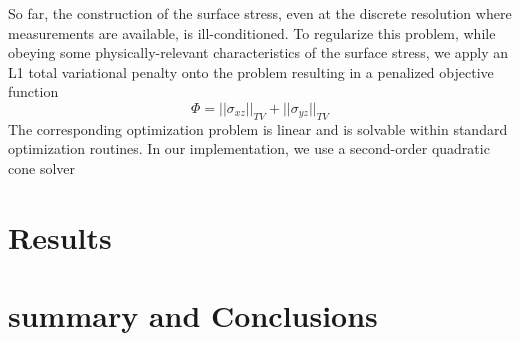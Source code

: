 \documentclass[aps,prl,reprint,twocolumn,groupedaddress,showpacs]{revtex4-1}
\begin{document}
So far, the construction of the surface stress, even at the discrete
resolution where measurements are available, is ill-conditioned. To
regularize this problem, while obeying some physically-relevant
characteristics of the surface stress, we apply an L1 total
variational penalty onto the problem resulting in a penalized
objective function
%
\begin{equation}
\Phi = ||\sigma_{xz}||_{TV} +  ||\sigma_{yz}||_{TV}
\end{equation}
%
The corresponding optimization problem is linear and is solvable within standard optimization routines. In our implementation, we use a second-order 
quadratic cone solver 


\section{Results}

\section{summary and Conclusions}



\end{document}
